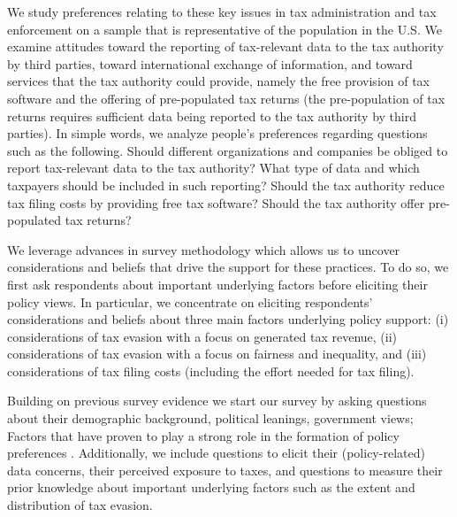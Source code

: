 \documentclass[12pt]{article}
\begin{document}
We study preferences relating to these key issues in tax administration and tax enforcement on a sample that is representative of the population in the U.S. We examine attitudes toward the reporting of tax-relevant data to the tax authority by third parties, toward international exchange of information, and toward services that the tax authority could provide, namely the free provision of tax software and the offering of pre-populated tax returns (the pre-population of tax returns requires sufficient data being reported to the tax authority by third parties). In simple words, we analyze people's preferences regarding questions such as the following. Should different organizations and companies be obliged to report tax-relevant data to the tax authority? What type of data and which taxpayers should be included in such reporting? Should the tax authority reduce tax filing costs by providing free tax software? Should the tax authority offer pre-populated tax returns?

We leverage advances in survey methodology which allows us to uncover considerations and beliefs that drive the support for these practices. To do so, we first ask respondents about important underlying factors before eliciting their policy views. In particular, we concentrate on eliciting respondents' considerations and beliefs about three main factors underlying policy support: (i) considerations of tax evasion with a focus on generated tax revenue, (ii) considerations of tax evasion with a focus on fairness and inequality, and (iii) considerations of tax filing costs (including the effort needed for tax filing). 

Building on previous survey evidence we start our survey by asking questions about their demographic background, political leanings, government views; Factors that have proven to play a strong role in the formation of policy preferences \parencite{alesina2018intergenerational,stantcheva2021understanding}. Additionally, we include questions to elicit their (policy-related) data concerns, their perceived exposure to taxes, and questions to measure their prior knowledge about important underlying factors such as the extent and distribution of tax evasion. 
\end{document}
